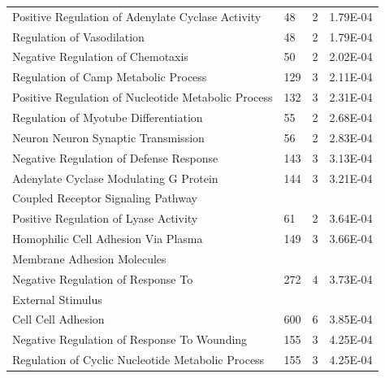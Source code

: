 \begin{refsection}
\begin{table}[H]
\begin{tabular}{@{}llll@{}}
Positive Regulation of Adenylate Cyclase Activity   & 48  & 2 & 1.79E-04         \\
Regulation of Vasodilation                          & 48  & 2 & 1.79E-04         \\
Negative Regulation of Chemotaxis                   & 50  & 2 & 2.02E-04         \\
Regulation of Camp Metabolic Process                & 129 & 3 & 2.11E-04         \\
Positive Regulation of Nucleotide Metabolic Process & 132 & 3 & 2.31E-04         \\
Regulation of Myotube Differentiation               & 55  & 2 & 2.68E-04         \\
Neuron Neuron Synaptic Transmission                 & 56  & 2 & 2.83E-04         \\
Negative Regulation of Defense Response             & 143 & 3 & 3.13E-04         \\
Adenylate Cyclase Modulating G Protein              & 144 & 3 & 3.21E-04         \\
Coupled Receptor Signaling Pathway                  &     &   &                  \\
Positive Regulation of Lyase Activity               & 61  & 2 & 3.64E-04         \\
Homophilic Cell Adhesion Via Plasma                 & 149 & 3 & 3.66E-04         \\
Membrane Adhesion Molecules                         &     &   &                  \\
Negative Regulation of Response To                  & 272 & 4 & 3.73E-04         \\
External Stimulus                                   &     &   &                  \\
Cell Cell Adhesion                                  & 600 & 6 & 3.85E-04         \\
Negative Regulation of Response To Wounding         & 155 & 3 & 4.25E-04         \\
Regulation of Cyclic Nucleotide Metabolic Process   & 155 & 3 & 4.25E-04         \\
\hline
\end{tabular}
\end{table}



\end{refsection}
